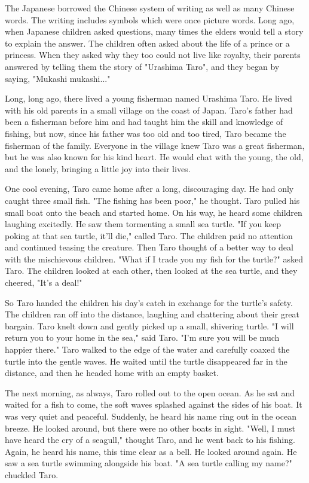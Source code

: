 The Japanese borrowed the Chinese system of writing as well as many Chinese words. The writing includes symbols which were once picture words. Long ago, when Japanese children asked questions, many times the elders would tell a story to explain the answer. The children often asked about the life of a prince or a princess. When they asked why they too could not live like royalty, their parents answered by telling them the story of "Urashima Taro", and they began by saying, "Mukashi mukashi..."

Long, long ago, there lived a young fisherman named Urashima Taro. He lived with his old parents in a small village on the coast of Japan. Taro's father had been a fisherman before him and had taught him the skill and knowledge of fishing, but now, since his father was too old and too tired, Taro became the fisherman of the family. Everyone in the village knew Taro was a great fisherman, but he was also known for his kind heart. He would chat with the young, the old, and the lonely, bringing a little joy into their lives.

One cool evening, Taro came home after a long, discouraging day. He had only caught three small fish. "The fishing has been poor," he thought. Taro pulled his small boat onto the beach and started home. On his way, he heard some children laughing excitedly. He saw them tormenting a small sea turtle. "If you keep poking at that sea turtle, it'll die," called Taro. The children paid no attention and continued teasing the creature. Then Taro thought of a better way to deal with the mischievous children. "What if I trade you my fish for the turtle?" asked Taro. The children looked at each other, then looked at the sea turtle, and they cheered, "It's a deal!"

So Taro handed the children his day's catch in exchange for the turtle's safety. The children ran off into the distance, laughing and chattering about their great bargain. Taro knelt down and gently picked up a small, shivering turtle. "I will return you to your home in the sea," said Taro. "I'm sure you will be much happier there." Taro walked to the edge of the water and carefully coaxed the turtle into the gentle waves. He waited until the turtle disappeared far in the distance, and then he headed home with an empty basket.

The next morning, as always, Taro rolled out to the open ocean. As he sat and waited for a fish to come, the soft waves splashed against the sides of his boat. It was very quiet and peaceful. Suddenly, he heard his name ring out in the ocean breeze. He looked around, but there were no other boats in sight. "Well, I must have heard the cry of a seagull," thought Taro, and he went back to his fishing. Again, he heard his name, this time clear as a bell. He looked around again. He saw a sea turtle swimming alongside his boat. "A sea turtle calling my name?" chuckled Taro.

